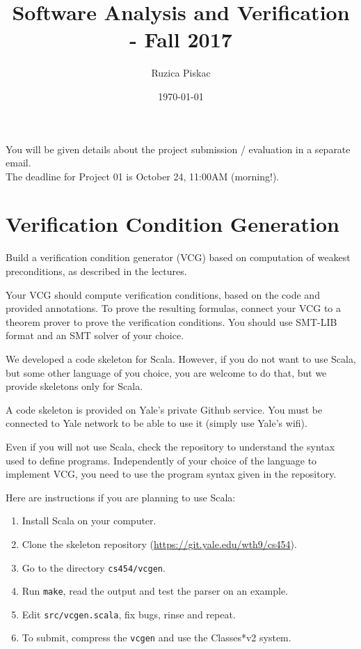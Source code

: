 \documentclass[11pt]{article}
\title{Software Analysis and Verification - Fall 2017}
\author{Ruzica Piskac}%
\date{\today}
\begin{document}
\maketitle

You will be given details about the project submission / evaluation in a separate email.\\

The deadline for Project 01 is October 24, 11:00AM (morning!).

\section{Verification Condition Generation}

Build a verification condition generator (VCG) based on computation of weakest
preconditions, as described in the lectures.

Your VCG should compute verification conditions, based on the code and
provided annotations. To prove the resulting formulas, connect your VCG to a
theorem prover to prove the verification conditions. You should use SMT-LIB
format and an SMT solver of your choice.


We developed a code skeleton for Scala. However, if you do not want to use Scala, but some other language of you choice, you are welcome to do that, but we provide skeletons only for Scala. 

A code skeleton is provided on Yale's private Github service.  You must be
connected to Yale network to be able to use it (simply use Yale's wifi).

Even if you will not use Scala, check the repository to understand the syntax used to define programs. Independently of your choice of the language to implement VCG,
 you need to use the program syntax given in the repository.

Here are instructions if you are planning to use Scala:
\begin{enumerate}
\item Install Scala on your computer.
\item Clone the skeleton repository (\url{https://git.yale.edu/wth9/cs454}).
\item Go to the directory \texttt{cs454/vcgen}.
\item Run \texttt{make}, read the output and test the parser on an example.
\item Edit \texttt{src/vcgen.scala}, fix bugs, rinse and repeat.
\item To submit, compress the \texttt{vcgen} and use the Classes*v2 system.
\end{enumerate}
\end{document}
